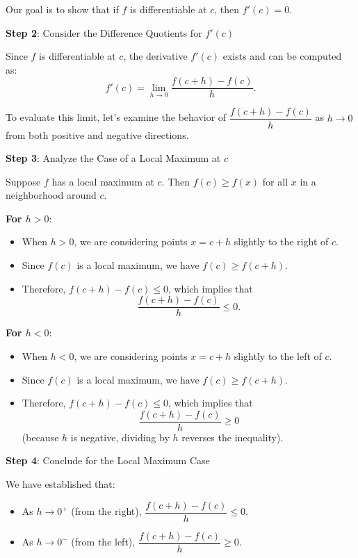 \documentclass[a4paper,12pt]{book}
\begin{document}
Our goal is to show that if \( f \) is differentiable at \( c \), then \( f'(c) = 0 \).

\textbf{Step 2}: Consider the Difference Quotients for \( f'(c) \)

Since \( f \) is differentiable at \( c \), the derivative \( f'(c) \) exists and can be computed as:
\[
f'(c) = \lim_{h \to 0} \dfrac{f(c + h) - f(c)}{h}.
\]

To evaluate this limit, let’s examine the behavior of \( \dfrac{f(c + h) - f(c)}{h} \) as \( h \to 0 \) from both positive and negative directions.

\textbf{Step 3}: Analyze the Case of a Local Maximum at \( c \)

Suppose \( f \) has a local maximum at \( c \). Then \( f(c) \geqslant f(x) \) for all \( x \) in a neighborhood around \( c \).

\textbf{For \( h > 0 \)}:

\begin{itemize}
	\item 
	When \( h > 0 \), we are considering points \( x = c + h \) slightly to the right of \( c \).
	\item 
	Since \( f(c) \) is a local maximum, we have \( f(c) \geqslant f(c + h) \).
	\item 
	Therefore, \( f(c + h) - f(c) \leqslant 0 \), which implies that
	\[
	\dfrac{f(c + h) - f(c)}{h} \leqslant 0.
	\]
\end{itemize}

\textbf{For \( h < 0 \)}:

\begin{itemize}
	\item 
	When \( h < 0 \), we are considering points \( x = c + h \) slightly to the left of \( c \).
	\item 
	Since \( f(c) \) is a local maximum, we have \( f(c) \geqslant f(c + h) \).
	\item 
	Therefore, \( f(c + h) - f(c) \leqslant 0 \), which implies that
	\[
	\dfrac{f(c + h) - f(c)}{h} \geqslant 0
	\]
	(because \( h \) is negative, dividing by \( h \) reverses the inequality).
\end{itemize}

\textbf{Step 4}: Conclude for the Local Maximum Case

We have established that:

\begin{itemize}
	\item 
	As \( h \to 0^+ \) (from the right), \( \dfrac{f(c + h) - f(c)}{h} \leqslant 0 \).
	\item 
	As \( h \to 0^- \) (from the left), \( \dfrac{f(c + h) - f(c)}{h} \geqslant 0 \).
\end{itemize}
\end{document}
